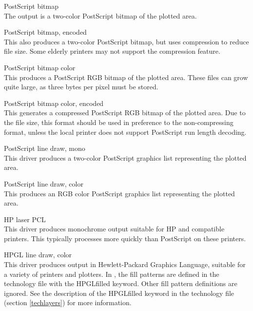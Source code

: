 \begin{description}
\item{PostScript bitmap}\\
The output is a two-color PostScript bitmap of the plotted area.

\item{\et PostScript bitmap, encoded}\\
This also produces a two-color PostScript bitmap, but uses compression
to reduce file size.  Some elderly printers may not support the
compression feature.

\item{\et PostScript bitmap color}\\
This produces a PostScript RGB bitmap of the plotted area.  These
files can grow quite large, as three bytes per pixel must be stored.

\item{\et PostScript bitmap color, encoded}\\
This generates a compressed PostScript RGB bitmap of the plotted area. 
Due to the file size, this format should be used in preference to the
non-compressing format, unless the local printer does not support
PostScript run length decoding.

\item{\et PostScript line draw, mono}\\
This driver produces a two-color PostScript graphics list representing
the plotted area.

\item{\et PostScript line draw, color}\\
This produces an RGB color PostScript graphics list representing the
plotted area.

\item{\et HP laser PCL}\\
This driver produces monochrome output suitable for HP and compatible
printers.  This typically processes more quickly than PostScript on
these printers.

\item{\et HPGL line draw, color}\\
This driver produces output in Hewlett-Packard Graphics Language,
suitable for a variety of printers and plotters.  In {\Xic}, the fill
patterns are defined in the technology file with the {\vt HPGLfilled}
keyword.  Other fill pattern definitions are ignored.  See the
description of the {\et HPGLfilled} keyword in the technology file
(section \ref{techlayers}) for more information.


\end{description}
